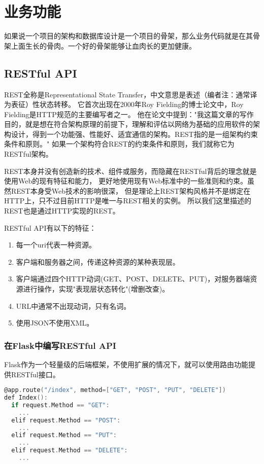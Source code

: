 \section{业务功能}

如果说一个项目的架构和数据库设计是一个项目的骨架，那么业务代码就是在其骨架上面生长的骨肉。一个好的骨架能够让血肉长的更加健康。

\subsection{RESTful API}

REST全称是Representational State Transfer，中文意思是表述（编者注：通常译为表征）性状态转移。 它首次出现在2000年Roy Fielding的博士论文中，Roy Fielding是HTTP规范的主要编写者之一。 他在论文中提到："我这篇文章的写作目的，就是想在符合架构原理的前提下，理解和评估以网络为基础的应用软件的架构设计，得到一个功能强、性能好、适宜通信的架构。REST指的是一组架构约束条件和原则。" 如果一个架构符合REST的约束条件和原则，我们就称它为RESTful架构。

REST本身并没有创造新的技术、组件或服务，而隐藏在RESTful背后的理念就是使用Web的现有特征和能力， 更好地使用现有Web标准中的一些准则和约束。虽然REST本身受Web技术的影响很深， 但是理论上REST架构风格并不是绑定在HTTP上，只不过目前HTTP是唯一与REST相关的实例。 所以我们这里描述的REST也是通过HTTP实现的REST。

RESTful API有以下的特征：

\begin{enumerate}
	\item 每一个uri代表一种资源。
	\item 客户端和服务器之间，传递这种资源的某种表现层。
	\item 客户端通过四个HTTP动词(GET、POST、DELETE、PUT)，对服务器端资源进行操作，实现"表现层状态转化"(增删改查)。
	\item URL中通常不出现动词，只有名词。
	\item 使用JSON不使用XML。
\end{enumerate}

\subsubsection{在Flask中编写RESTful API}

Flask作为一个轻量级的后端框架，不使用扩展的情况下，就可以使用路由功能提供RESTful接口。

\begin{lstlisting}[language=C]
@app.route("/index", method=["GET", "POST", "PUT", "DELETE"])
def Index():
  if request.Method == "GET":
    ...
  elif request.Method == "POST":
    ...
  elif request.Method == "PUT":
    ...
  elif request.Method == "DELETE":
    ...
\end{lstlisting}


